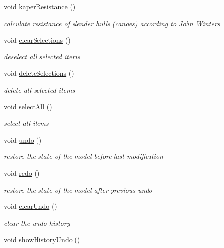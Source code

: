 \begin{DoxyCompactItemize}
void \hyperlink{classShipCAD_1_1Controller_ad4335a4380f34eace0a0aa6a3a4abdf5}{kaper\+Resistance} ()
\begin{DoxyCompactList}\small\item\em calculate resistance of slender hulls (canoes) according to John Winters \end{DoxyCompactList}\item 
void \hyperlink{classShipCAD_1_1Controller_a993e2dfe6bb88cf07375e6a57d2d15a5}{clear\+Selections} ()
\begin{DoxyCompactList}\small\item\em deselect all selected items \end{DoxyCompactList}\item 
void \hyperlink{classShipCAD_1_1Controller_a07a48262bd736b3e2e3da4123b1f08a4}{delete\+Selections} ()
\begin{DoxyCompactList}\small\item\em delete all selected items \end{DoxyCompactList}\item 
void \hyperlink{classShipCAD_1_1Controller_a97a0dfdd229e0d7e0e7d5995dd9095a3}{select\+All} ()
\begin{DoxyCompactList}\small\item\em select all items \end{DoxyCompactList}\item 
void \hyperlink{classShipCAD_1_1Controller_a52b8812ceca0b4368dea2e2b4399d860}{undo} ()
\begin{DoxyCompactList}\small\item\em restore the state of the model before last modification \end{DoxyCompactList}\item 
void \hyperlink{classShipCAD_1_1Controller_aeb55fe16b48f14b00c179e95a0372a17}{redo} ()
\begin{DoxyCompactList}\small\item\em restore the state of the model after previous undo \end{DoxyCompactList}\item 
void \hyperlink{classShipCAD_1_1Controller_ad9c16d37e77b98b2f289839d4f337325}{clear\+Undo} ()
\begin{DoxyCompactList}\small\item\em clear the undo history \end{DoxyCompactList}\item 
void \hyperlink{classShipCAD_1_1Controller_a32103fdef0de00b63eba1ef4282c5598}{show\+History\+Undo} ()

\end{DoxyCompactItemize}
